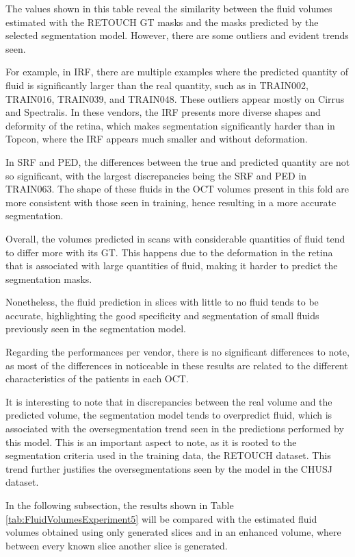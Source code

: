 The values shown in this table reveal the similarity between the fluid volumes estimated with the RETOUCH GT masks and the masks predicted by the selected segmentation model. However, there are some outliers and evident trends seen.
\par
For example, in IRF, there are multiple examples where the predicted quantity of fluid is significantly larger than the real quantity, such as in TRAIN002, TRAIN016, TRAIN039, and TRAIN048. These outliers appear mostly on Cirrus and Spectralis. In these vendors, the IRF presents more diverse shapes and deformity of the retina, which makes segmentation significantly harder than in Topcon, where the IRF appears much smaller and without deformation.
\par
In SRF and PED, the differences between the true and predicted quantity are not so significant, with the largest discrepancies being the SRF and PED in TRAIN063. The shape of these fluids in the OCT volumes present in this fold are more consistent with those seen in training, hence resulting in a more accurate segmentation.
\par
Overall, the volumes predicted in scans with considerable quantities of fluid tend to differ more with its GT. This happens due to the deformation in the retina that is associated with large quantities of fluid, making it harder to predict the segmentation masks.
\par
Nonetheless, the fluid prediction in slices with little to no fluid tends to be accurate, highlighting the good specificity and segmentation of small fluids previously seen in the segmentation model.
\par
Regarding the performances per vendor, there is no significant differences to note, as most of the differences in noticeable in these results are related to the different characteristics of the patients in each OCT.
\par
It is interesting to note that in discrepancies between the real volume and the predicted volume, the segmentation model tends to overpredict fluid, which is associated with the oversegmentation trend seen in the predictions performed by this model. This is an important aspect to note, as it is rooted to the segmentation criteria used in the training data, the RETOUCH dataset. This trend further justifies the oversegmentations seen by the model in the CHUSJ dataset.
\par
In the following subsection, the results shown in Table \ref{tab:FluidVolumesExperiment5} will be compared with the estimated fluid volumes obtained using only generated slices and in an enhanced volume, where between every known slice another slice is generated.

